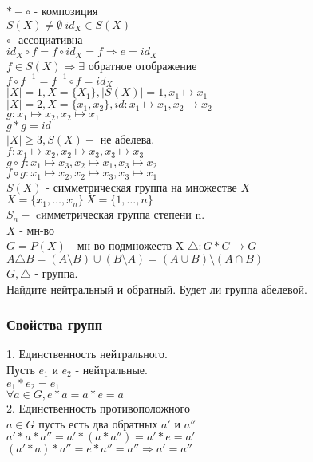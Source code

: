 $ * - \circ $ - композиция \\
$ S(X) \neq \emptyset \ id_X \in S(X) $ \\
$ \circ $ -ассоциативна \\
$ id_X \circ f = f \circ id_X = f \Rightarrow e = id_X $ \\
$ f \in S(X) \Rightarrow \exists $ обратное отображение \\
$ f \circ f^{-1} = f^{-1} \circ f = id_X $ \\
$ |X| = 1, X=\{X_1\} , |S(X)| = 1, x_1 \mapsto x_1 $ \\
$ |X| = 2, X = \{x_1, x_2\}, id: x_1 \mapsto x_1, x_2 \mapsto x_2 $ \\
$ g: x_1 \mapsto x_2, x_2 \mapsto x_1 $ \\
$ g * g = id $ \\
$ |X| \geq 3, S(X) -$ не абелева. \\
$ f: x_1 \mapsto x_2, x_2 \mapsto x_3, x_3 \mapsto x_3 $ \\
$ g \circ f: x_1 \mapsto x_3, x_2 \mapsto x_1, x_3 \mapsto x_2  $\\
$ f \circ g: x_1 \mapsto x_2, x_2 \mapsto x_3, x_3 \mapsto x_1 $ \\
$ S(X) $ - симметрическая группа на множестве $X$ \\
$ X = \{ x_1, \dots, x_n \} \ X = \{ 1, \dots, n \} $ \\
$ S_n - $ cимметрическая группа степени n. \\
$ X $ - мн-во \\
$ G = P(X) $ - мн-во подмножеств X
$ \triangle : G * G \rightarrow G $ \\
$ A \triangle B = (A \setminus B) \cup (B \setminus A) = (A \cup B) \setminus (A \cap B)$ \\
$ G, \triangle $ - группа. \\
Найдите нейтральный и обратный. Будет ли группа абелевой. \\
\subsubsection{Свойства групп}
1. Единственность нейтрального. \\
Пусть $e_1 $ и $e_2$ - нейтральные. \\
$ e_1 * e_2 = e_1$ \\
$ \forall a \in G, e*a=a*e=a $\\
2. Единственность противоположного \\ 
$ a \in G $ пусть есть два обратных $ a'$ и $a'' $\\
$ a' * a * a'' = a'*(a*a'') = a'*e=a' $\\
$ (a' *a) *a'' = e * a'' = a'' \Rightarrow a' = a'' $
